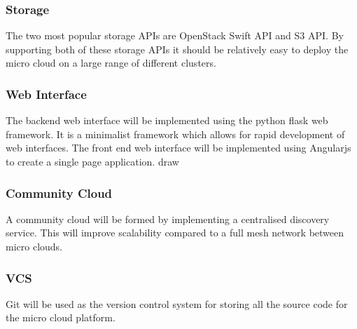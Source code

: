 \documentclass{sig-alternate-05-2015}
\begin{document}
\subsubsection{Storage}
The two most popular storage APIs are OpenStack Swift API and S3 API. By supporting both of these storage APIs it should be relatively easy to deploy the micro cloud on a large range of different clusters.

\subsubsection{Web Interface}
The backend web interface will be implemented using the python flask web framework. It is a minimalist framework which allows for rapid development of web interfaces. 
The front end web interface will be implemented using Angularjs to create a single page application. 
draw
\subsubsection{Community Cloud}
A community cloud will be formed by implementing a centralised discovery service. This will improve scalability compared to a full mesh network between micro clouds.

\subsubsection{VCS}
Git will be used as the version control system for storing all the source code for the micro cloud platform.



 
\end{document}
